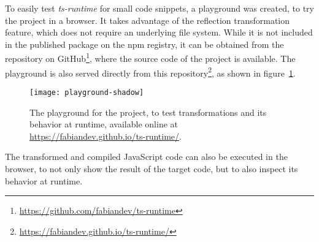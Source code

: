 To easily test \emph{ts-runtime} for small code snippets, a playground was created, to try the project in a browser. It takes advantage of the reflection transformation feature, which does not require an underlying file system. While it is not included in the published package on the npm registry, it can be obtained from the repository on GitHub\footnote{\url{https://github.com/fabiandev/ts-runtime}}, where the source code of the project is available. The playground is also served directly from this repository\footnote{\url{https://fabiandev.github.io/ts-runtime/}}, as shown in figure~\ref{fig:playground}.
\begin{figure}
\centering
\texttt{[image: playground-shadow]}
\caption{The playground for the project, to test transformations and its behavior at runtime, available online at \url{https://fabiandev.github.io/ts-runtime/}.}
\label{fig:playground}
\end{figure}
The transformed and compiled JavaScript code can also be executed in the browser, to not only show the result of the target code, but to also inspect its behavior at runtime.







